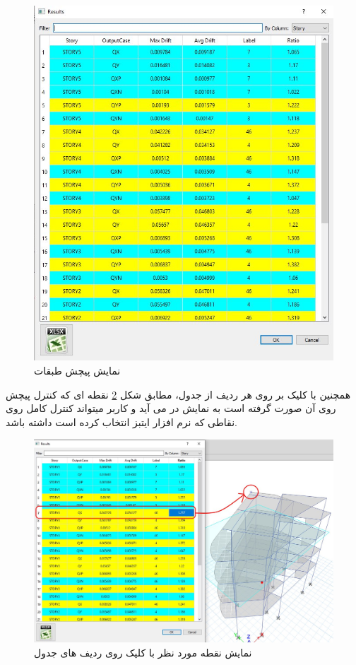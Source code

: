 \begin{figure}[H]
    \centering
    \includegraphics[scale=0.7]{figures/torsion_table}
    \caption{نمایش پیچش طبقات}
    \label{pic:torsion}
\end{figure}

همچنین با کلیک بر روی هر ردیف از جدول، مطابق شکل 
\ref{pic:torsion_show_node}
نقطه ای که کنترل پیچش روی آن صورت گرفته است به نمایش در می آید و کاربر میتواند کنترل کامل روی نقاطی
که نرم افزار ایتبز انتخاب کرده است داشته باشد.

\begin{figure}[H]
    \centering
    \includegraphics[scale=0.4]{figures/torsion_show_node}
    \caption{نمایش نقطه مورد نظر با کلیک روی ردیف های جدول}
    \label{pic:torsion_show_node}
\end{figure}

